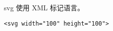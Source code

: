 
\begin{issues}
\issueDraft
\end{issues}

svg 使用 XML 标记语言。

\begin{lstlisting}[language=none]
<svg width="100" height="100">
\end{lstlisting}

